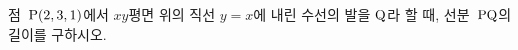 점~$\mathrm{P}(2{,}\mkern3mu\mathopen{}3{,}\mkern3mu\mathopen{}1)$에서 $xy$평면 위의 직선 $y=x$에 내린 수선의 발을 $\mathrm{Q}$라 할 때, 선분~$\mathrm{PQ}$의 길이를 구하시오.
